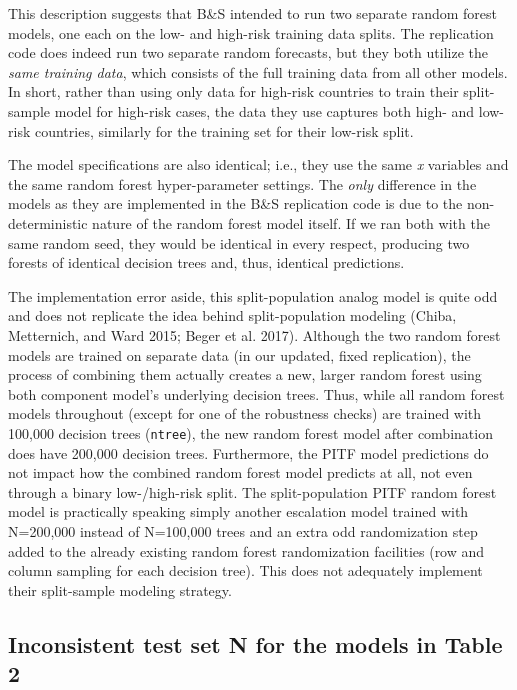 \documentclass[
]{article}
\begin{document}
This description suggests that B\&S intended to run two separate random forest models, one each on the low- and high-risk training data splits. The replication code does indeed run two separate random forecasts, but they both utilize the \emph{same training data}, which consists of the full training data from all other models. In short, rather than using only data for high-risk countries to train their split-sample model for high-risk cases, the data they use captures both high- and low-risk countries, similarly for the training set for their low-risk split.

The model specifications are also identical; i.e., they use the same \emph{x} variables and the same random forest hyper-parameter settings. The \emph{only} difference in the models as they are implemented in the B\&S replication code is due to the non-deterministic nature of the random forest model itself. If we ran both with the same random seed, they would be identical in every respect, producing two forests of identical decision trees and, thus, identical predictions.

The implementation error aside, this split-population analog model is quite odd and does not replicate the idea behind split-population modeling (Chiba, Metternich, and Ward 2015; Beger et al. 2017). Although the two random forest models are trained on separate data (in our updated, fixed replication), the process of combining them actually creates a new, larger random forest using both component model's underlying decision trees. Thus, while all random forest models throughout (except for one of the robustness checks) are trained with 100,000 decision trees (\texttt{ntree}), the new random forest model after combination does have 200,000 decision trees. Furthermore, the PITF model predictions do not impact how the combined random forest model predicts at all, not even through a binary low-/high-risk split. The split-population PITF random forest model is practically speaking simply another escalation model trained with N=200,000 instead of N=100,000 trees and an extra odd randomization step added to the already existing random forest randomization facilities (row and column sampling for each decision tree). This does not adequately implement their split-sample modeling strategy.

\hypertarget{inconsistent-test-set-n-for-the-models-in-table-2}{%
\subsection{Inconsistent test set N for the models in Table 2}\label{inconsistent-test-set-n-for-the-models-in-table-2}}
\end{document}

